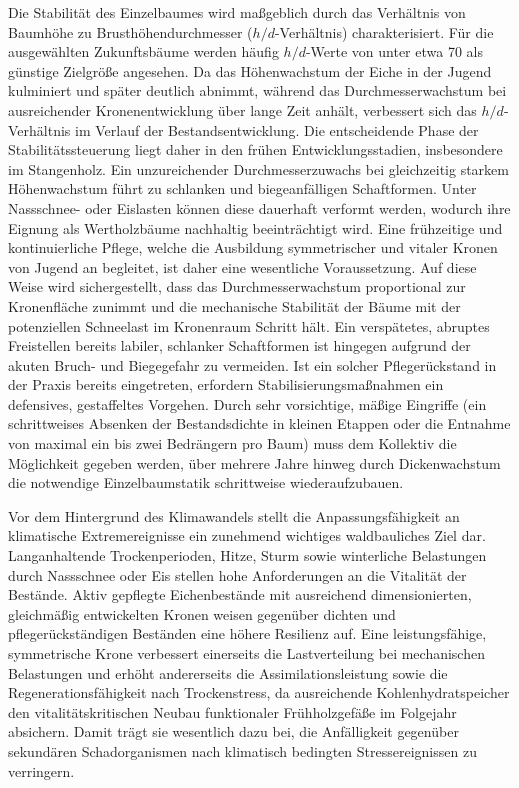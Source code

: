 \documentclass[twocolumn, bibliography=totoc, abstract=true]{scrartcl}
\begin{document}
Die Stabilität des Einzelbaumes wird maßgeblich durch das Verhältnis von Baumhöhe zu Brusthöhendurchmesser ($h/d$-Verhältnis) charakterisiert. Für die ausgewählten Zukunftsbäume werden häufig $h/d$-Werte von unter etwa 70 als günstige Zielgröße angesehen. Da das Höhenwachstum der Eiche in der Jugend kulminiert und später deutlich abnimmt, während das Durchmesserwachstum bei ausreichender Kronenentwicklung über lange Zeit anhält, verbessert sich das $h/d$-Verhältnis im Verlauf der Bestandsentwicklung. Die entscheidende Phase der Stabilitätssteuerung liegt daher in den frühen Entwicklungsstadien, insbesondere im Stangenholz. Ein unzureichender Durchmesserzuwachs bei gleichzeitig starkem Höhenwachstum führt zu schlanken und biegeanfälligen Schaftformen. Unter Nassschnee- oder Eislasten können diese dauerhaft verformt werden, wodurch ihre Eignung als Wertholzbäume nachhaltig beeinträchtigt wird. Eine frühzeitige und kontinuierliche Pflege, welche die Ausbildung symmetrischer und vitaler Kronen von Jugend an begleitet, ist daher eine wesentliche Voraussetzung. Auf diese Weise wird sichergestellt, dass das Durchmesserwachstum proportional zur Kronenfläche zunimmt und die mechanische Stabilität der Bäume mit der potenziellen Schneelast im Kronenraum Schritt hält. Ein verspätetes, abruptes Freistellen bereits labiler, schlanker Schaftformen ist hingegen aufgrund der akuten Bruch- und Biegegefahr zu vermeiden. Ist ein solcher Pflegerückstand in der Praxis bereits eingetreten, erfordern Stabilisierungsmaßnahmen ein defensives, gestaffeltes Vorgehen. Durch sehr vorsichtige, mäßige Eingriffe (ein schrittweises Absenken der Bestandsdichte in kleinen Etappen oder die Entnahme von maximal ein bis zwei Bedrängern pro Baum) muss dem Kollektiv die Möglichkeit gegeben werden, über mehrere Jahre hinweg durch Dickenwachstum die notwendige Einzelbaumstatik schrittweise wiederaufzubauen.

Vor dem Hintergrund des Klimawandels stellt die Anpassungsfähigkeit an klimatische Extremereignisse ein zunehmend wichtiges waldbauliches Ziel dar. Langanhaltende Trockenperioden, Hitze, Sturm sowie winterliche Belastungen durch Nassschnee oder Eis stellen hohe Anforderungen an die Vitalität der Bestände. Aktiv gepflegte Eichenbestände mit ausreichend dimensionierten, gleichmäßig entwickelten Kronen weisen gegenüber dichten und pflegerückständigen Beständen eine höhere Resilienz auf. Eine leistungsfähige, symmetrische Krone verbessert einerseits die Lastverteilung bei mechanischen Belastungen und erhöht andererseits die Assimilationsleistung sowie die Regenerationsfähigkeit nach Trockenstress, da ausreichende Kohlenhydratspeicher den vitalitätskritischen Neubau funktionaler Frühholzgefäße im Folgejahr absichern. Damit trägt sie wesentlich dazu bei, die Anfälligkeit gegenüber sekundären Schadorganismen nach klimatisch bedingten Stressereignissen zu verringern.
\end{document}
